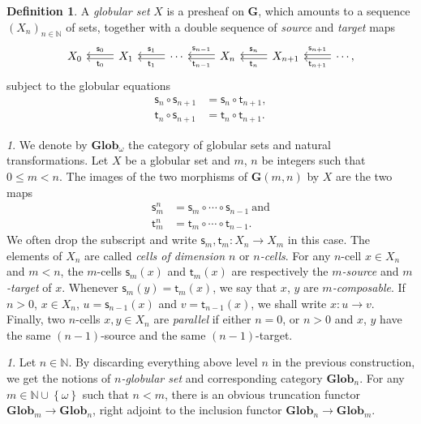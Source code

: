 \documentclass[reqno]{amsart}
\theoremstyle{plain}
\theoremstyle{definition}
\newtheorem{definition}[subsubsection]{Definition}
\theoremstyle{remark}
\newtheorem{paragr}[subsubsection]{} %
\newcommand{\nmbr}[1]{\mathbb #1}
\newcommand{\N}{\nmbr{N}}
\newcommand{\set}[1]{\left\{#1\right\}}
\newcommand{\source}{\mathsf{s}} %
\newcommand{\target}{\mathsf{t}} %
\newcommand{\homset}[3]{#1(#2,#3)} %
\newcommand{\ctg}[1]{\mathbf{#1}}  %
\newcommand{\glob}{\ctg{G}}%
\newcommand{\Glob}{\ctg{Glob}}
\newcommand{\nGlob}[1]{\Glob_{#1}} %
\newcommand{\oGlob}{\nGlob{\omega}} %
\newcommand{\tdouble}[3]{
  \arrow[#1,shift left=0.4ex,#3]
  \arrow[#1,shift right=0.4ex,#2]
}
\newcommand{\sce}[1]{\source_{#1}} %
\newcommand{\tge}[1]{\target_{#1}} %
\newcommand{\oo}{\ensuremath{\omega}}
\begin{document}
\begin{definition}\label{def:globular_set}
  A {\em globular set} $X$ is a presheaf on $\glob$, which amounts to a sequence
$(X_n)_{n\in\N}$ of sets, together with a double sequence of {\em source} and {\em target} maps
\[
  \begin{tikzcd}
   X_0 & X_1 \tdouble{l}{"\sce{0}"'}{"\tge{0}"}& \tdouble{l}{"\sce{1}"'}{"\tge{1}"}\cdots & X_n \tdouble{l}{"\sce{n-1}"'}{"\tge{n-1}"}& \tdouble{l}{"\sce{n}"'}{"\tge{n}"} X_{n+1}& \cdots \tdouble{l}{"\sce{n+1}"'}{"\tge{n+1}"},
  \end{tikzcd}
  \]
subject to the globular equations
\begin{align*}
  \sce{n}\circ\sce{n+1} & = \sce{n}\circ\tge{n+1},\\
  \tge{n}\circ\sce{n+1}& = \tge{n}\circ\tge{n+1}.
\end{align*}
\end{definition}
\begin{paragr}
  We denote by $\oGlob$ the category of globular sets and natural
  transformations. Let $X$ be a globular set and  $m$, $n$ be integers
  such that $0\leq m<n$. The images of the two morphisms of
  $\homset{\glob}{m}{n}$ by $X$ are the two maps 
\begin{align*}
  \sce{m}^n & = \sce{m}\circ\cdots\circ \sce{n-1}\ \text{and}\\
   \tge{m}^n & = \tge{m}\circ\cdots\circ \tge{n-1}.
\end{align*}
We often drop the subscript and write $\sce{m},\tge{m}:X_n\to X_m$ in this case. The elements of $X_n$ are called {\em cells of dimension $n$}  or {\em $n$-cells}. For any $n$-cell $x\in X_n$ and $m<n$, the $m$-cells $\sce m(x)$ and $\tge m(x)$ are respectively the {\em $m$-source} and {\em $m$-target} of $x$. Whenever $\sce m(y)=\tge m(x)$, we say that $x$, $y$ are {\em $m$-composable}.
If $n>0$, $x\in X_n$, $u=\sce{n-1}(x)$ and $v=\tge{n-1}(x)$, we shall write $x:u\to v$.
Finally, two $n$-cells $x,y\in X_n$ are {\em parallel} if either $n=0$, or $n>0$ and $x$, $y$ have the same $(n{-}1)$-source and the same $(n{-}1)$-target.

\end{paragr}

\begin{paragr}
  Let $n\in \N$. By discarding everything above level $n$ in the previous construction, we get the notions of {\em $n$-globular set} and corresponding category $\nGlob n$. For any $m\in\N\cup\set{\oo}$ such that $n<m$, there is an obvious truncation functor $\nGlob m\to \nGlob n$, right adjoint to the inclusion functor $\nGlob n\to \nGlob m$.
\end{paragr}
\end{document}
